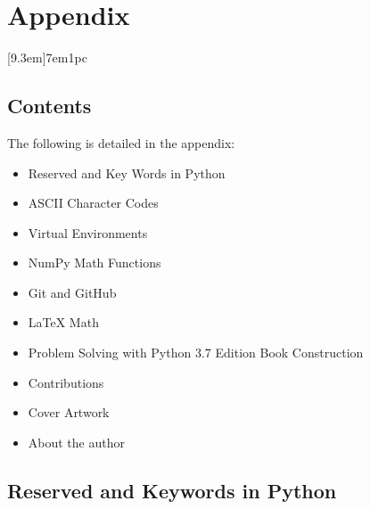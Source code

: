 \documentclass{book}
\begin{document}
    




    
        \hypertarget{appendix}{%
\chapter*{Appendix}\label{appendix} 
 } 
 \renewcommand{\thesection}{\Alph{section}.} 
 \setcounter{section}{0} 
  \renewcommand{\thesection}{Appendix \Alph{section}} 
 [9.3em]{}{7em}{1pc} 
    




    
        \hypertarget{contents}{%
\section{Contents}\label{contents}}
    




    
        The following is detailed in the appendix:

\begin{itemize}
\item
  Reserved and Key Words in Python
\item
  ASCII Character Codes
\item
  Virtual Environments
\item
  NumPy Math Functions
\item
  Git and GitHub
\item
  LaTeX Math
\item
  Problem Solving with Python 3.7 Edition Book Construction
\item
  Contributions
\item
  Cover Artwork
\item
  About the author
\end{itemize}
        \newpage

    




    
        \hypertarget{reserved-and-keywords-in-python}{%
\section{Reserved and Keywords in
Python}\label{reserved-and-keywords-in-python}}
    
\end{document}
